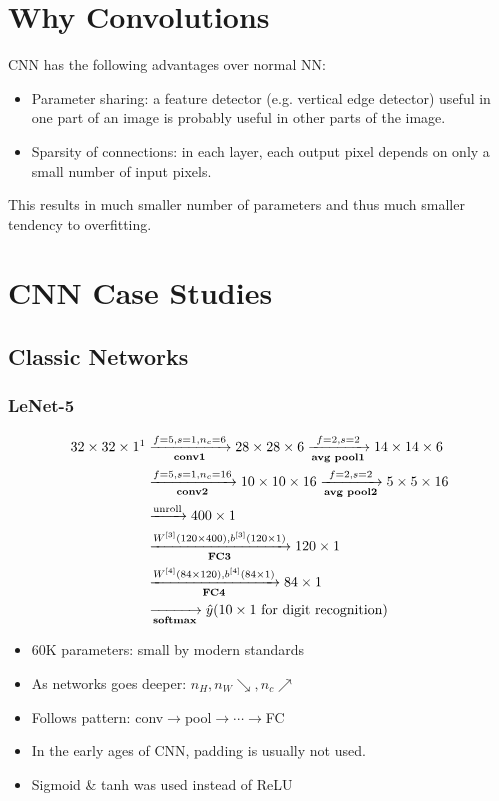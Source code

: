 \section{Why Convolutions}
CNN has the following advantages over normal NN:
\begin{itemize}
  \item Parameter sharing: a feature detector (e.g. vertical edge detector) useful in one part of an image is probably useful in other parts of the image.
  \item Sparsity of connections: in each layer, each output pixel depends on only a small number of input pixels.
\end{itemize}
This results in much smaller number of parameters and thus much smaller tendency to overfitting.
\section{CNN Case Studies}
\subsection{Classic Networks}
\subsubsection{LeNet-5}
\begin{align*}
  32\times 32\times 1\footnotemark&\xrightarrow[\textbf{conv1}]{f=5,s=1,n_c=6}28\times 28\times 6\xrightarrow[\textbf{avg pool1}]{f=2,s=2}14\times 14\times 6\\
  &\xrightarrow[\textbf{conv2}]{f=5,s=1,n_c=16}10\times 10\times 16\xrightarrow[\textbf{avg pool2}]{f=2,s=2}5\times 5\times 16\\
  &\xrightarrow{\text{unroll}}400\times 1\\
  &\xrightarrow[\textbf{FC3}]{W^{[3]}(120\times 400), b^{[3]}(120\times 1)}120\times 1\\
  &\xrightarrow[\textbf{FC4}]{W^{[4]}(84\times 120), b^{[4]}(84\times 1)}84\times 1\\
  &\xrightarrow[\textbf{softmax}]{}\hat{y}(10\times 1\text{ for digit recognition})
\end{align*}
\begin{itemize}
  \item 60K parameters: small by modern standards
  \item As networks goes deeper: $n_H,n_W\searrow,n_c\nearrow$
  \item Follows pattern: conv$\rightarrow$pool$\rightarrow\cdots\rightarrow$FC
  \item In the early ages of CNN, padding is usually not used.
  \item Sigmoid \& tanh was used instead of ReLU
\end{itemize}
